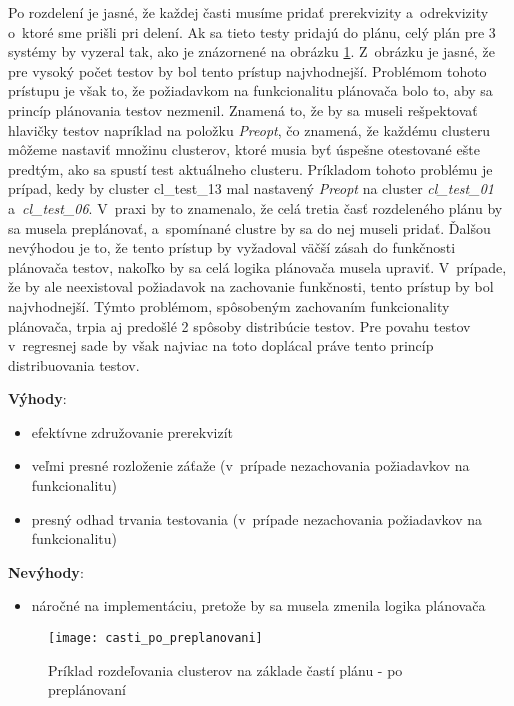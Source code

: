Po rozdelení je jasné, že každej časti musíme pridať prerekvizity a~odrekvizity
o~ktoré sme prišli pri delení. Ak sa tieto testy pridajú do plánu, celý plán
pre 3 systémy by vyzeral tak, ako je znázornené na obrázku \ref{obrazok:distribucia_casti_po_preplanovani}.
Z~obrázku je jasné, že pre vysoký počet testov by bol tento prístup najvhodnejší.
Problémom tohoto prístupu je však to, že požiadavkom na funkcionalitu plánovača bolo to,
aby sa princíp plánovania testov nezmenil. Znamená to, že by sa museli rešpektovať hlavičky testov
napríklad na položku \emph{Preopt}, čo znamená, že každému clusteru môžeme nastaviť množinu clusterov,
ktoré musia byť úspešne otestované ešte predtým, ako sa spustí test aktuálneho clusteru.
Príkladom tohoto problému je prípad, kedy by cluster cl\_test\_13 mal nastavený 
\emph{Preopt} na cluster \emph{cl\_test\_01} a~\emph{cl\_test\_06}.
V~praxi by to znamenalo, že celá tretia časť rozdeleného plánu by sa musela preplánovať,
a~spomínané clustre by sa do nej museli pridať. Ďalšou nevýhodou je to, že tento prístup by
vyžadoval väčší zásah do funkčnosti plánovača testov, nakoľko by sa celá logika plánovača musela upraviť.
V~prípade, že by ale neexistoval požiadavok na zachovanie funkčnosti, tento prístup by bol najvhodnejší.
Týmto problémom, spôsobeným zachovaním funkcionality plánovača, trpia aj predošlé 2 spôsoby distribúcie testov. 
Pre povahu testov v~regresnej sade by však najviac na toto doplácal práve tento princíp distribuovania testov.  

\noindent \textbf{Výhody}:
\begin{itemize}
\item efektívne združovanie prerekvizít
\item veľmi presné rozloženie záťaže (v~prípade nezachovania požiadavkov na funkcionalitu)
\item presný odhad trvania testovania (v~prípade nezachovania požiadavkov na funkcionalitu)
\end{itemize} 

\noindent \textbf{Nevýhody}:
\begin{itemize}
\item náročné na implementáciu, pretože by sa musela zmenila logika plánovača
\end{itemize}

\begin{figure}[h]
  \begin{center}
    \texttt{[image: casti\_po\_preplanovani]}
    \caption{Príklad rozdeľovania clusterov na základe častí plánu - po preplánovaní}
    \label{obrazok:distribucia_casti_po_preplanovani}
  \end{center}
\end{figure}

